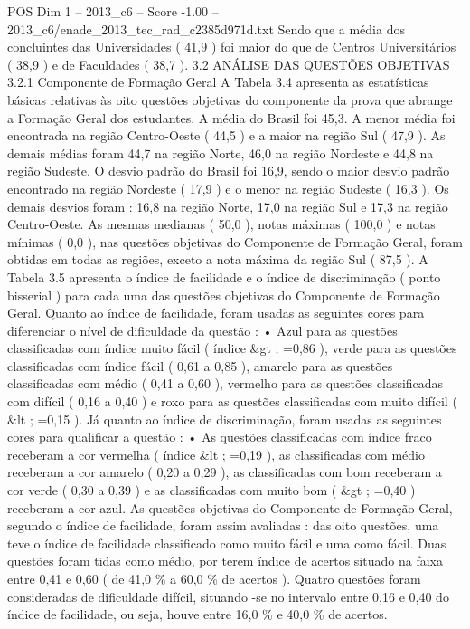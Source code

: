 \begin{textsample}{POS Dim 1 – 2013\_c6 – Score -1.00 – 2013\_c6/enade\_2013\_tec\_rad\_c2385d971d.txt}
Sendo que a média dos concluintes das Universidades ( 41,9 ) foi maior do que de Centros Universitários ( 38,9 ) e de Faculdades ( 38,7 ). 3.2 ANÁLISE DAS QUESTÕES OBJETIVAS 3.2.1 Componente de Formação Geral A Tabela 3.4 apresenta as estatísticas básicas relativas às oito questões objetivas do componente da prova que abrange a Formação Geral dos estudantes.
A média do Brasil foi 45,3.
A menor média foi encontrada na região Centro-Oeste ( 44,5 ) e a maior na região Sul ( 47,9 ).
As demais médias foram 44,7 na região Norte, 46,0 na região Nordeste e 44,8 na região Sudeste.
O desvio padrão do Brasil foi 16,9, sendo o maior desvio padrão encontrado na região Nordeste ( 17,9 ) e o menor na região Sudeste ( 16,3 ).
Os demais desvios foram : 16,8 na região Norte, 17,0 na região Sul e 17,3 na região Centro-Oeste.
As mesmas medianas ( 50,0 ), notas máximas ( 100,0 ) e notas mínimas ( 0,0 ), nas questões objetivas do Componente de Formação Geral, foram obtidas em todas as regiões, exceto a nota máxima da região Sul ( 87,5 ).
A Tabela 3.5 apresenta o índice de facilidade e o índice de discriminação ( ponto bisserial ) para cada uma das questões objetivas do Componente de Formação Geral.
Quanto ao índice de facilidade, foram usadas as seguintes cores para diferenciar o nível de dificuldade da questão : • Azul para as questões classificadas com índice muito fácil ( índice \&gt ; =0,86 ), verde para as questões classificadas com índice fácil ( 0,61 a 0,85 ), amarelo para as questões classificadas com médio ( 0,41 a 0,60 ), vermelho para as questões classificadas com difícil ( 0,16 a 0,40 ) e roxo para as questões classificadas com muito difícil ( \&lt ; =0,15 ).
Já quanto ao índice de discriminação, foram usadas as seguintes cores para qualificar a questão : • As questões classificadas com índice fraco receberam a cor vermelha ( índice \&lt ; =0,19 ), as classificadas com médio receberam a cor amarelo ( 0,20 a 0,29 ), as classificadas com bom receberam a cor verde ( 0,30 a 0,39 ) e as classificadas com muito bom ( \&gt ; =0,40 ) receberam a cor azul.
As questões objetivas do Componente de Formação Geral, segundo o índice de facilidade, foram assim avaliadas : das oito questões, uma teve o índice de facilidade classificado como muito fácil e uma como fácil.
Duas questões foram tidas como médio, por terem índice de acertos situado na faixa entre 0,41 e 0,60 ( de 41,0 \% a 60,0 \% de acertos ).
Quatro questões foram consideradas de dificuldade difícil, situando -se no intervalo entre 0,16 e 0,40 do índice de facilidade, ou seja, houve entre 16,0 \% e 40,0 \% de acertos.

\end{textsample}
